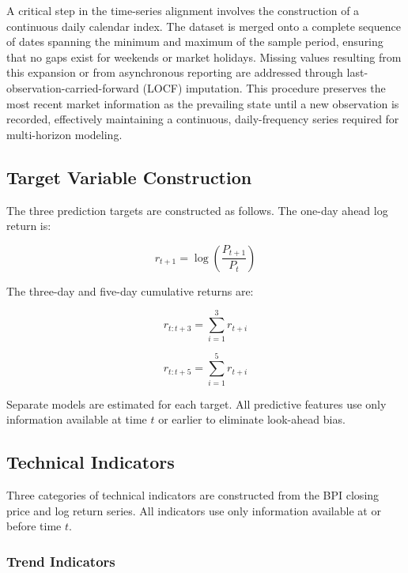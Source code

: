 \documentclass[12pt]{article}
\begin{document}
A critical step in the time-series alignment involves the construction of a continuous daily calendar index. The dataset is merged onto a complete sequence of dates spanning the minimum and maximum of the sample period, ensuring that no gaps exist for weekends or market holidays. Missing values resulting from this expansion or from asynchronous reporting are addressed through last-observation-carried-forward (LOCF) imputation. This procedure preserves the most recent market information as the prevailing state until a new observation is recorded, effectively maintaining a continuous, daily-frequency series required for multi-horizon modeling.

\subsection{Target Variable Construction}

The three prediction targets are constructed as follows. The one-day ahead log return is:

\begin{equation}
    r_{t+1} = \log\left(\frac{P_{t+1}}{P_t}\right)
    \label{eq:r1}
\end{equation}

The three-day and five-day cumulative returns are:

\begin{equation}
    r_{t:t+3} = \sum_{i=1}^{3} r_{t+i}
    \label{eq:r3}
\end{equation}

\begin{equation}
    r_{t:t+5} = \sum_{i=1}^{5} r_{t+i}
    \label{eq:r5}
\end{equation}

Separate models are estimated for each target. All predictive features use only information available at time $t$ or earlier to eliminate look-ahead bias.

\subsection{Technical Indicators}

Three categories of technical indicators are constructed from the BPI closing price and log return series. All indicators use only information available at or before time $t$.

\subsubsection*{Trend Indicators}
\end{document}
